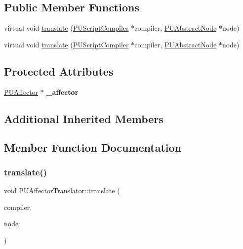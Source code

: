 \subsection*{Public Member Functions}
\begin{DoxyCompactItemize}
\item 
virtual void \hyperlink{classPUAffectorTranslator_a858504444a91d88d0dc648449198b582}{translate} (\hyperlink{classPUScriptCompiler}{P\+U\+Script\+Compiler} $\ast$compiler, \hyperlink{classPUAbstractNode}{P\+U\+Abstract\+Node} $\ast$node)
\item 
virtual void \hyperlink{classPUAffectorTranslator_adc3a736d93e089a8aa95921aa0a5aeb8}{translate} (\hyperlink{classPUScriptCompiler}{P\+U\+Script\+Compiler} $\ast$compiler, \hyperlink{classPUAbstractNode}{P\+U\+Abstract\+Node} $\ast$node)
\end{DoxyCompactItemize}
\subsection*{Protected Attributes}
\begin{DoxyCompactItemize}
\item 
\mbox{\label{classPUAffectorTranslator_a0a34cf1cdc6eea69274e7d5110a03abf}} 
\hyperlink{classPUAffector}{P\+U\+Affector} $\ast$ {\bfseries \+\_\+affector}
\end{DoxyCompactItemize}
\subsection*{Additional Inherited Members}


\subsection{Member Function Documentation}
\mbox{\label{classPUAffectorTranslator_a858504444a91d88d0dc648449198b582}} 
\subsubsection{\texorpdfstring{translate()}{translate()}\hspace{0.1cm}{\footnotesize\ttfamily [1/2]}}
{\footnotesize\ttfamily void P\+U\+Affector\+Translator\+::translate (\begin{DoxyParamCaption}\item[{\hyperlink{classPUScriptCompiler}{P\+U\+Script\+Compiler} $\ast$}]{compiler,  }\item[{\hyperlink{classPUAbstractNode}{P\+U\+Abstract\+Node} $\ast$}]{node }\end{DoxyParamCaption})\hspace{0.3cm}{\ttfamily [virtual]}}

